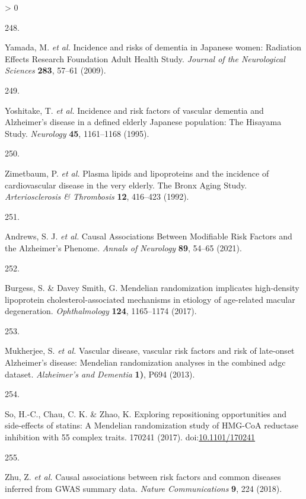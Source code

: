 \documentclass[a4paper, twoside]{templates/ociamthesis}
\newlength{\cslhangindent}
\newlength{\csllabelwidth}
\newenvironment{CSLReferences}[3] %
 {%
  \setlength{\parindent}{0pt}
  \ifodd #1 \everypar{\setlength{\hangindent}{\cslhangindent}}\ignorespaces\fi
  \ifnum #2 > 0
  \setlength{\parskip}{#2\baselineskip}
  \fi
 }%
 {}
\newcommand{\CSLLeftMargin}[1]{\parbox[t]{\maxof{\widthof{#1}}{\csllabelwidth}}{#1}}
\newcommand{\CSLRightInline}[1]{\parbox[t]{\linewidth - \csllabelwidth}{#1}}
\begin{document}
\begin{CSLReferences}{0}{0}
\leavevmode\hypertarget{ref-yamada2009}{}%
\CSLLeftMargin{248. }
\CSLRightInline{Yamada, M. \emph{et al.} Incidence and risks of dementia in {Japanese} women: Radiation {Effects Research Foundation Adult Health Study}. \emph{Journal of the Neurological Sciences} \textbf{283}, 57--61 (2009).}

\leavevmode\hypertarget{ref-yoshitake1995}{}%
\CSLLeftMargin{249. }
\CSLRightInline{Yoshitake, T. \emph{et al.} Incidence and risk factors of vascular dementia and {Alzheimer}'s disease in a defined elderly {Japanese} population: The {Hisayama Study}. \emph{Neurology} \textbf{45}, 1161--1168 (1995).}

\leavevmode\hypertarget{ref-zimetbaum1992}{}%
\CSLLeftMargin{250. }
\CSLRightInline{Zimetbaum, P. \emph{et al.} Plasma lipids and lipoproteins and the incidence of cardiovascular disease in the very elderly. {The Bronx Aging Study}. \emph{Arteriosclerosis \& Thrombosis} \textbf{12}, 416--423 (1992).}

\leavevmode\hypertarget{ref-andrews2021}{}%
\CSLLeftMargin{251. }
\CSLRightInline{Andrews, S. J. \emph{et al.} Causal {Associations Between Modifiable Risk Factors} and the {Alzheimer}'s {Phenome}. \emph{Annals of Neurology} \textbf{89}, 54--65 (2021).}

\leavevmode\hypertarget{ref-burgess2017}{}%
\CSLLeftMargin{252. }
\CSLRightInline{Burgess, S. \& Davey Smith, G. Mendelian randomization implicates high-density lipoprotein cholesterol-associated mechanisms in etiology of age-related macular degeneration. \emph{Ophthalmology} \textbf{124}, 1165--1174 (2017).}

\leavevmode\hypertarget{ref-mukherjee2013}{}%
\CSLLeftMargin{253. }
\CSLRightInline{Mukherjee, S. \emph{et al.} Vascular disease, vascular risk factors and risk of late-onset {Alzheimer}'s disease: Mendelian randomization analyses in the combined adgc dataset. \emph{Alzheimer's and Dementia} \textbf{1)}, P694 (2013).}

\leavevmode\hypertarget{ref-so2017}{}%
\CSLLeftMargin{254. }
\CSLRightInline{So, H.-C., Chau, C. K. \& Zhao, K. Exploring repositioning opportunities and side-effects of statins: A {Mendelian} randomization study of {HMG}-{CoA} reductase inhibition with 55 complex traits. 170241 (2017). doi:\href{https://doi.org/10.1101/170241}{10.1101/170241}}

\leavevmode\hypertarget{ref-zhu2018}{}%
\CSLLeftMargin{255. }
\CSLRightInline{Zhu, Z. \emph{et al.} Causal associations between risk factors and common diseases inferred from {GWAS} summary data. \emph{Nature Communications} \textbf{9}, 224 (2018).}


\end{CSLReferences}
\end{document}
